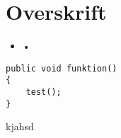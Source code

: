\documentclass[Preamble]{subfiles}
\begin{document}
\chapter{Overskrift}


	\begin{itemize}
	\item •
	\end{itemize}


\begin{lstlisting}[caption=Titel, style=Code-C++, label=lst:]
public void funktion()
{
	test();
}
\end{lstlisting}



kjahsd
\end{document}

